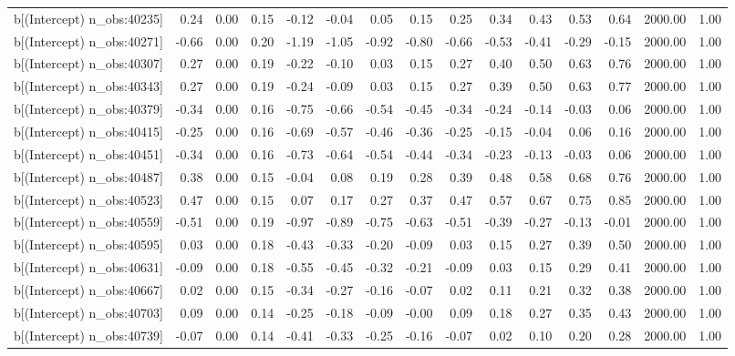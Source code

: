 \begin{table}[ht]
\begin{tabular}{rrrrrrrrrrrrrrr}
  b[(Intercept) n\_obs:40235] & 0.24 & 0.00 & 0.15 & -0.12 & -0.04 & 0.05 & 0.15 & 0.25 & 0.34 & 0.43 & 0.53 & 0.64 & 2000.00 & 1.00 \\ 
  b[(Intercept) n\_obs:40271] & -0.66 & 0.00 & 0.20 & -1.19 & -1.05 & -0.92 & -0.80 & -0.66 & -0.53 & -0.41 & -0.29 & -0.15 & 2000.00 & 1.00 \\ 
  b[(Intercept) n\_obs:40307] & 0.27 & 0.00 & 0.19 & -0.22 & -0.10 & 0.03 & 0.15 & 0.27 & 0.40 & 0.50 & 0.63 & 0.76 & 2000.00 & 1.00 \\ 
  b[(Intercept) n\_obs:40343] & 0.27 & 0.00 & 0.19 & -0.24 & -0.09 & 0.03 & 0.15 & 0.27 & 0.39 & 0.50 & 0.63 & 0.77 & 2000.00 & 1.00 \\ 
  b[(Intercept) n\_obs:40379] & -0.34 & 0.00 & 0.16 & -0.75 & -0.66 & -0.54 & -0.45 & -0.34 & -0.24 & -0.14 & -0.03 & 0.06 & 2000.00 & 1.00 \\ 
  b[(Intercept) n\_obs:40415] & -0.25 & 0.00 & 0.16 & -0.69 & -0.57 & -0.46 & -0.36 & -0.25 & -0.15 & -0.04 & 0.06 & 0.16 & 2000.00 & 1.00 \\ 
  b[(Intercept) n\_obs:40451] & -0.34 & 0.00 & 0.16 & -0.73 & -0.64 & -0.54 & -0.44 & -0.34 & -0.23 & -0.13 & -0.03 & 0.06 & 2000.00 & 1.00 \\ 
  b[(Intercept) n\_obs:40487] & 0.38 & 0.00 & 0.15 & -0.04 & 0.08 & 0.19 & 0.28 & 0.39 & 0.48 & 0.58 & 0.68 & 0.76 & 2000.00 & 1.00 \\ 
  b[(Intercept) n\_obs:40523] & 0.47 & 0.00 & 0.15 & 0.07 & 0.17 & 0.27 & 0.37 & 0.47 & 0.57 & 0.67 & 0.75 & 0.85 & 2000.00 & 1.00 \\ 
  b[(Intercept) n\_obs:40559] & -0.51 & 0.00 & 0.19 & -0.97 & -0.89 & -0.75 & -0.63 & -0.51 & -0.39 & -0.27 & -0.13 & -0.01 & 2000.00 & 1.00 \\ 
  b[(Intercept) n\_obs:40595] & 0.03 & 0.00 & 0.18 & -0.43 & -0.33 & -0.20 & -0.09 & 0.03 & 0.15 & 0.27 & 0.39 & 0.50 & 2000.00 & 1.00 \\ 
  b[(Intercept) n\_obs:40631] & -0.09 & 0.00 & 0.18 & -0.55 & -0.45 & -0.32 & -0.21 & -0.09 & 0.03 & 0.15 & 0.29 & 0.41 & 2000.00 & 1.00 \\ 
  b[(Intercept) n\_obs:40667] & 0.02 & 0.00 & 0.15 & -0.34 & -0.27 & -0.16 & -0.07 & 0.02 & 0.11 & 0.21 & 0.32 & 0.38 & 2000.00 & 1.00 \\ 
  b[(Intercept) n\_obs:40703] & 0.09 & 0.00 & 0.14 & -0.25 & -0.18 & -0.09 & -0.00 & 0.09 & 0.18 & 0.27 & 0.35 & 0.43 & 2000.00 & 1.00 \\ 
  b[(Intercept) n\_obs:40739] & -0.07 & 0.00 & 0.14 & -0.41 & -0.33 & -0.25 & -0.16 & -0.07 & 0.02 & 0.10 & 0.20 & 0.28 & 2000.00 & 1.00 \\ 

\end{tabular}
\end{table}

